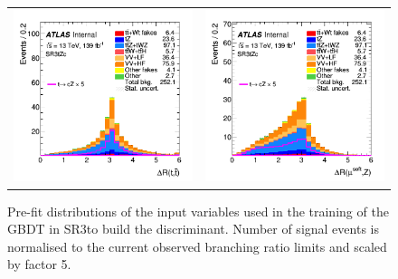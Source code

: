 \begin{figure}[!htbp]
\begin{tabular}{cc}
		\includegraphics[width=.45\textwidth]{Chapters/CH6/figures/SR3_UsingSMT/ttbar_dR} &
		\includegraphics[width=.45\textwidth]{Chapters/CH6/figures/SR3_UsingSMT/softmuZ_dR} \\
	\end{tabular}
	\caption{Pre-fit distributions of the input variables used in the training of the GBDT in SR3\tZc to build the \Dthree discriminant. Number of signal events is normalised to the current observed branching ratio limits and scaled by factor 5.  
		\ErrStatOnly
		\Blinded
	}%
	\label{fig:separation:SR3}
\end{figure}

\clearpage

